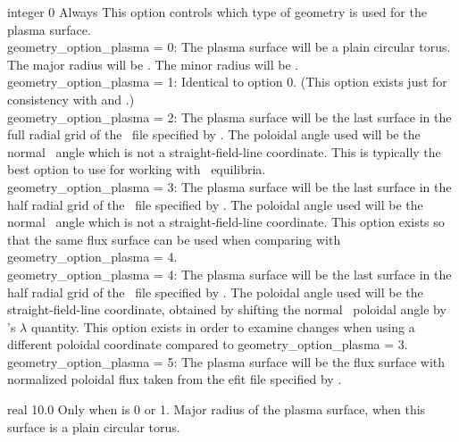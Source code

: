 {integer}
{0}
{Always}
{This option controls which type of geometry is used for the plasma surface.\\

{\ttfamily geometry\_option\_plasma} = 0: The plasma surface will be a plain circular torus. The major radius will be .
     The minor radius will be .\\

{\ttfamily geometry\_option\_plasma} = 1: Identical to option 0. (This option exists just for consistency with  and .)\\

{\ttfamily geometry\_option\_plasma} = 2: The plasma surface will be the last surface in the full radial grid of the \vmec~file specified by .
The poloidal angle used will be the normal \vmec~angle which is not a straight-field-line coordinate.
This is typically the best option to use for working with \vmec~equilibria.\\

{\ttfamily geometry\_option\_plasma} = 3: The plasma surface will be the last surface in the half radial grid of the \vmec~file specified by .
The poloidal angle used will be the normal \vmec~angle which is not a straight-field-line coordinate.
This option exists so that the same flux surface can be used when comparing with {\ttfamily geometry\_option\_plasma} = 4.\\

{\ttfamily geometry\_option\_plasma} = 4: The plasma surface will be the last surface in the half radial grid of the \vmec~file specified by .
The poloidal angle used will be the straight-field-line coordinate, obtained by shifting the normal \vmec~poloidal angle by \vmec's $\lambda$ quantity.
This option exists in order to examine changes when using a different poloidal coordinate compared to {\ttfamily geometry\_option\_plasma} = 3.\\

{\ttfamily geometry\_option\_plasma} = 5: The plasma surface will be the flux surface with normalized poloidal flux
 taken from the {\ttfamily efit} file specified by .
}

\myhrule

{real}
{10.0}
{Only when  is 0 or 1.}
{Major radius of the plasma surface, when this surface is a plain circular torus.}

